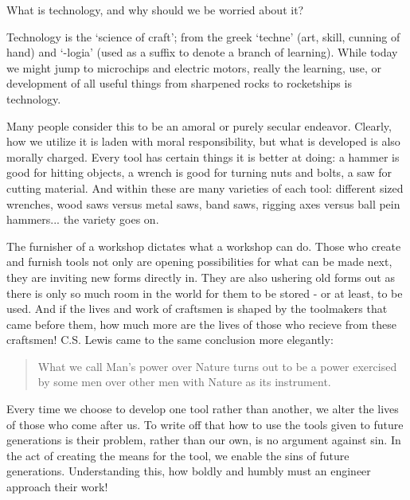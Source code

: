 \documentclass[letterpaper]{article}
\begin{document}
What is technology, and why should we be worried about it?

Technology is the `science of craft'; from the greek `techne' (art, skill, cunning of hand) and `-logia' (used as a suffix to denote a branch of learning). While today we might jump to microchips and electric motors, really the learning, use, or development of all useful things from sharpened rocks to rocketships is technology.

Many people consider this to be an amoral or purely secular endeavor. Clearly, how we utilize it is laden with moral responsibility, but what is developed is also morally charged. Every tool has certain things it is better at doing: a hammer is good for hitting objects, a wrench is good for turning nuts and bolts, a saw for cutting material. And within these are many varieties of each tool: different sized wrenches, wood saws versus metal saws, band saws, rigging axes versus ball pein hammers... the variety goes on.

The furnisher of a workshop dictates what a workshop can do. Those who create and furnish tools not only are opening possibilities for what can be made next, they are inviting new forms directly in. They are also ushering old forms out as there is only so much room in the world for them to be stored - or at least, to be used. And if the lives and work of craftsmen is shaped by the toolmakers that came before them, how much more are the lives of those who recieve from these craftsmen! C.S. Lewis came to the same conclusion more elegantly:

\begin{quote}
  What we call Man's power over Nature turns out to be a power exercised by some men over other men with Nature as its instrument.
\end{quote}

Every time we choose to develop one tool rather than another, we alter the lives of those who come after us. To write off that how to use the tools given to future generations is their problem, rather than our own, is no argument against sin. In the act of creating the means for the tool, we enable the sins of future generations. Understanding this, how boldly and humbly must an engineer approach their work!

\end{document}
